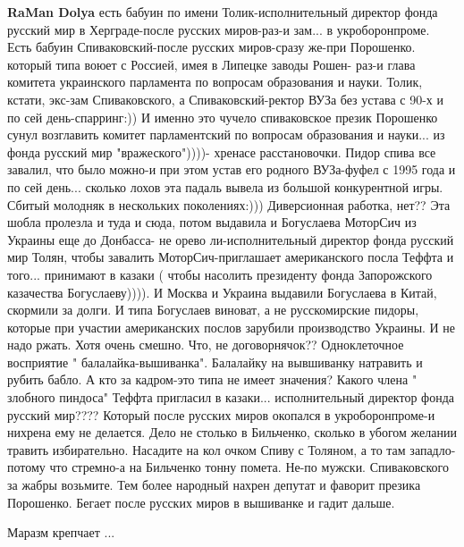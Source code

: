 \begin{itemize}
\begin{itemize}
\textbf{RaMan Dolya} есть бабуин по имени Толик-исполнительный директор фонда
русский мир в Херграде-после русских миров-раз-и зам... в укроборонпроме. Есть
бабуин Спиваковский-после русских миров-сразу же-при Порошенко. который типа
воюет с Россией, имея в Липецке заводы Рошен- раз-и глава комитета украинского
парламента по вопросам образования и науки. Толик, кстати, экс-зам
Спиваковского, а Спиваковский-ректор ВУЗа без устава с 90-х и по сей
день-спарринг:)) И именно это чучело спиваковское презик Порошенко сунул
возглавить комитет парламентский по вопросам образования и науки... из фонда
русский мир "вражеского"))))- хренасе расстановочки. Пидор спива все завалил,
что было можно-и при этом устав его родного ВУЗа-фуфел с 1995 года и по сей
день... сколько лохов эта падаль вывела из большой конкурентной игры. Сбитый
молодняк в нескольких поколениях:))) Диверсионная работка, нет?? Эта шобла
пролезла и туда и сюда, потом выдавила и Богуслаева МоторСич из Украины еще до
Донбасса- не орево ли-исполнительный директор фонда русский мир Толян, чтобы
завалить МоторСич-приглашает американского посла Теффта и того... принимают в
казаки ( чтобы насолить президенту фонда Запорожского казачества
Богуслаеву)))). И Москва и Украина выдавили Богуслаева в Китай, скормили за
долги. И типа Богуслаев виноват, а не русскомирские пидоры, которые при участии
американских послов зарубили производство Украины. И не надо ржать. Хотя очень
смешно. Что, не договорнячок?? Одноклеточное восприятие " балалайка-вышиванка".
Балалайку на вывшиванку натравить и рубить бабло. А кто за кадром-это типа не
имеет значения? Какого члена " злобного пиндоса" Теффта пригласил в
казаки... исполнительный директор фонда русский мир???? Который после русских
миров окопался в укроборонпроме-и нихрена ему не делается. Дело не столько в
Бильченко, сколько в убогом желании травить избирательно. Насадите на кол очком
Спиву с Толяном, а то там западло-потому что стремно-а на Бильченко тонну
помета. Не-по мужски. Спиваковского за жабры возьмите. Тем более народный
нахрен депутат и фаворит презика Порошенко. Бегает после русских миров в
вышиванке и гадит дальше.

\end{itemize} %

 
Маразм крепчает ...


\end{itemize}
